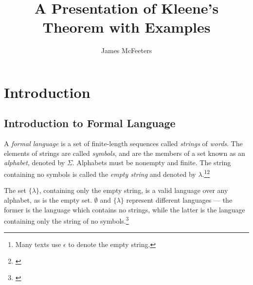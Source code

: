 \documentclass{bcthesis}
\title{A Presentation of Kleene's Theorem with Examples}
\author{James McFeeters}
\newif\ifbuildfrontmatter
\newcommand{\footcite}[2]{\footnote{\cite[pg.~{#2}]{#1}}}
\begin{document}
\ifbuildfrontmatter
\frontmatter

	\maketitle

	\begin{abstract}
		Your abstract goes here.
	\end{abstract}


	\begin{acknowledgments}
		Here you should acknowledge any special help on your project, or particular influences on your life or mathematical development.
	\end{acknowledgments}

	\tableofcontents
\fi

\mainmatter

\chapter{Introduction}%
\label{ch:introduction}

	\section{Introduction to Formal Language} %
	\label{sec:introduction_to_formal_language}

		A \textit{formal language} is a set of finite-length sequences called \textit{strings} of \textit{words}.
		The elements of strings are called \textit{symbols}, and are the members of a set known as an \textit{alphabet}, denoted by $\Sigma$.
		Alphabets must be nonempty and finite.
		The string containing no symbols is called the \textit{empty string} and denoted by $\lambda$.\footnote{
			Many texts use $\epsilon$ to denote the empty string.
		}\footcite{lemmings}{1-3}

		The set $\{ \lambda \}$, containing only the empty string, is a valid language over any alphabet, as is the empty set.
		$\emptyset$ and $\{ \lambda \}$ represent different languages --- the former is the language which contains no strings, while the latter is the language containing only the string of no symbols.\footcite{hopcroft}{2}
\end{document}
